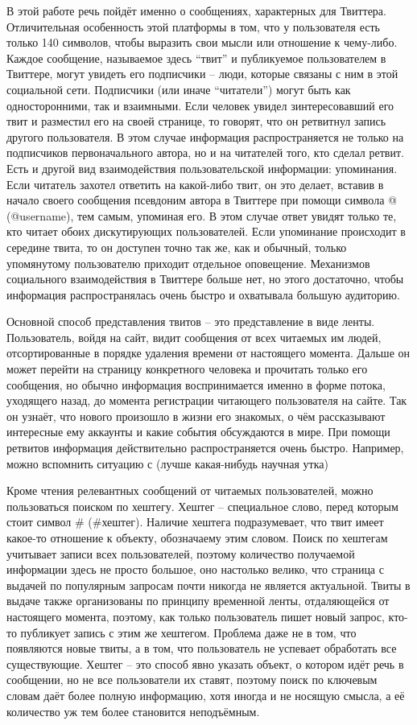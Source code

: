 В этой работе речь пойдёт именно о сообщениях, характерных для Твиттера.
Отличительная особенность этой платформы в том, что у пользователя есть
только 140 символов, чтобы выразить свои мысли или отношение к чему-либо.
Каждое сообщение, называемое здесь ``твит'' и публикуемое пользователем в
Твиттере, могут увидеть его подписчики -- люди, которые связаны с ним в этой
социальной сети. Подписчики (или иначе ``читатели'') могут быть как
односторонними, так и взаимными. Если человек увидел зинтересовавший его твит
и разместил его на своей странице, то говорят, что он ретвитнул
запись другого пользователя. В этом случае информация распространяется не только
на подписчиков первоначального автора, но и на читателей того, кто сделал
ретвит. Есть и другой вид взаимодействия пользовательской
информации: упоминания. Если читатель захотел ответить на какой-либо твит,
он это делает, вставив в начало своего сообщения псевдоним автора в Твиттере при помощи
символа @ (@username), тем самым, упоминая его. В этом случае ответ увидят
только те, кто читает обоих дискутирующих пользователей. Если упоминание
происходит в середине твита, то он доступен точно так же, как и обычный,
только упомянутому пользователю приходит отдельное оповещение.
Механизмов социального взаимодействия в Твиттере больше нет, но этого достаточно,
чтобы информация распространялась очень быстро и охватывала большую аудиторию.

Основной способ представления твитов -- это представление в виде ленты.
Пользователь, войдя на сайт, видит сообщения от всех читаемых им людей,
отсортированные в порядке удаления времени от настоящего момента. Дальше
он может перейти на страницу конкретного человека и прочитать только его
сообщения,  но обычно информация воспринимается именно в форме потока,
уходящего назад, до момента регистрации читающего пользователя на сайте.
Так он узнаёт, что нового произошло в жизни его знакомых, о чём рассказывают
интересные ему аккаунты и какие события обсуждаются в мире. При помощи ретвитов
информация действительно распространяется очень быстро. Например, можно
вспомнить ситуацию с (лучше какая-нибудь научная утка)

Кроме чтения релевантных сообщений от читаемых пользователей, можно
пользоваться поиском по хештегу. Хештег -- специальное слово, перед которым
стоит символ \# (\#хештег). Наличие хештега подразумевает, что твит имеет какое-то
отношение к объекту, обозначаему этим словом. Поиск по хештегам учитывает
записи всех пользователей, поэтому количество получаемой информации здесь не
просто большое, оно настолько велико, что страница с выдачей по популярным
запросам почти никогда не является актуальной. Твиты в выдаче также организованы
по принципу временной ленты, отдаляющейся от настоящего момента, поэтому, как
только пользователь пишет новый запрос, кто-то публикует запись с этим же хештегом.
Проблема даже не в том, что появляются новые твиты, а в том, что пользователь не
успевает обработать все существующие. Хештег -- это способ явно указать объект, о
котором идёт речь в сообщении, но не все пользователи их ставят, поэтому поиск
по ключевым словам даёт более полную информацию, хотя иногда и не носящую смысла,
а её количество уж тем более становится неподъёмным.

